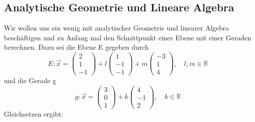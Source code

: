 \documentclass[fontsize=12pt,paper=a4,twoside,bibtotoc,idxtotoc,
liststotoc,pagesize,BCOR1.2cm,DIV15,chapterprefix,pagesize=pdftex]{scrbook}
\theoremstyle{plain}
\theoremstyle{definition}
\theoremstyle{remark}
\begin{document}
\subsection{Analytische Geometrie und Lineare Algebra}
Wir wollen uns ein wenig mit analytischer Geometrie und linearer Algebra beschäftigen und zu Anfang mal den Schnittpunkt einer Ebene mit einer Geraden 
berechnen. Dazu sei die Ebene E gegeben durch
\[ E: \vec{x}= 
\left ( \begin{array}{c}  2 \\ 1 \\ -1 \end{array} \right) +l 
\left ( \begin{array}{c}  1 \\ -1 \\ -1 \end{array} \right) +m
\left ( \begin{array}{c}  -3 \\ 1 \\ 4 \end{array} \right), \quad l,m
\in \mathbb{R}
\]
und die Gerade g
\[
g: \vec{x}=
\left ( \begin{array}{c}  3 \\ 0 \\ 1 \end{array} \right) +k
\left ( \begin{array}{c}  4 \\ -1 \\ 2 \end{array} \right), \quad k \in \mathbb{R}
\]
Gleichsetzen ergibt: 
\end{document}
